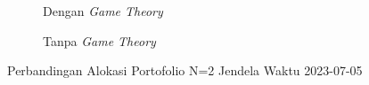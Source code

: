 % 
% 
% 
% 

% 
% 
% 
% 

\begin{figure}[!htbp]\centering\begin{subfigure}[b]{0.48\textwidth}\centering


\caption{Dengan \textit{Game Theory}}\end{subfigure}\hfill\begin{subfigure}[b]{0.48\textwidth}\centering


\caption{Tanpa \textit{Game Theory}}\end{subfigure}\caption{Perbandingan Alokasi Portofolio N=2 Jendela Waktu 2023-07-05}\label{fig:window_2023_07_05}\end{figure}


